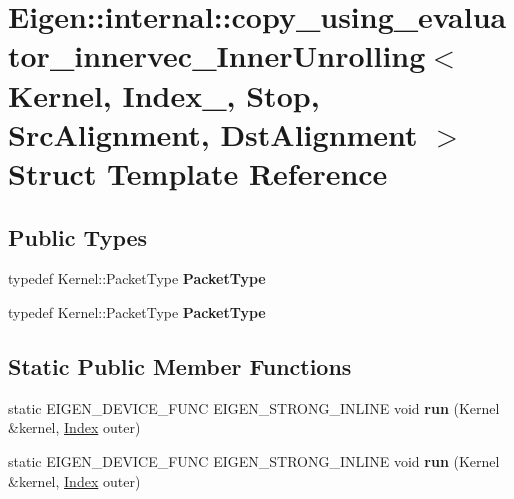 \hypertarget{struct_eigen_1_1internal_1_1copy__using__evaluator__innervec___inner_unrolling}{}\section{Eigen\+:\+:internal\+:\+:copy\+\_\+using\+\_\+evaluator\+\_\+innervec\+\_\+\+Inner\+Unrolling$<$ Kernel, Index\+\_\+, Stop, Src\+Alignment, Dst\+Alignment $>$ Struct Template Reference}
\label{struct_eigen_1_1internal_1_1copy__using__evaluator__innervec___inner_unrolling}
\subsection*{Public Types}
\begin{DoxyCompactItemize}
\item 
\mbox{\label{struct_eigen_1_1internal_1_1copy__using__evaluator__innervec___inner_unrolling_a7bd34f0aaff97549c85930302f539eef}} 
typedef Kernel\+::\+Packet\+Type {\bfseries Packet\+Type}
\item 
\mbox{\label{struct_eigen_1_1internal_1_1copy__using__evaluator__innervec___inner_unrolling_a7bd34f0aaff97549c85930302f539eef}} 
typedef Kernel\+::\+Packet\+Type {\bfseries Packet\+Type}
\end{DoxyCompactItemize}
\subsection*{Static Public Member Functions}
\begin{DoxyCompactItemize}
\item 
\mbox{\label{struct_eigen_1_1internal_1_1copy__using__evaluator__innervec___inner_unrolling_a50b1b52b49e7474bb4b6d77bb0286c2d}} 
static E\+I\+G\+E\+N\+\_\+\+D\+E\+V\+I\+C\+E\+\_\+\+F\+U\+NC E\+I\+G\+E\+N\+\_\+\+S\+T\+R\+O\+N\+G\+\_\+\+I\+N\+L\+I\+NE void {\bfseries run} (Kernel \&kernel, \hyperlink{namespace_eigen_a62e77e0933482dafde8fe197d9a2cfde}{Index} outer)
\item 
\mbox{\label{struct_eigen_1_1internal_1_1copy__using__evaluator__innervec___inner_unrolling_a50b1b52b49e7474bb4b6d77bb0286c2d}} 
static E\+I\+G\+E\+N\+\_\+\+D\+E\+V\+I\+C\+E\+\_\+\+F\+U\+NC E\+I\+G\+E\+N\+\_\+\+S\+T\+R\+O\+N\+G\+\_\+\+I\+N\+L\+I\+NE void {\bfseries run} (Kernel \&kernel, \hyperlink{namespace_eigen_a62e77e0933482dafde8fe197d9a2cfde}{Index} outer)
\end{DoxyCompactItemize}


